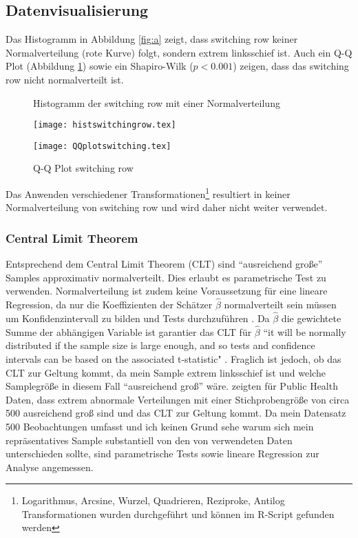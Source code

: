 \documentclass[11pt,a4paper]{article}
\begin{document}
\subsection{Datenvisualisierung}
Das Histogramm in Abbildung \ref{fig:a} zeigt, dass switching row keiner Normalverteilung (rote Kurve) folgt, sondern extrem linksschief ist. Auch ein Q-Q Plot (Abbildung \ref{fig:b}) sowie ein Shapiro-Wilk ($p < 0.001$) zeigen, dass das switching row nicht normalverteilt ist. 

\begin{figure}
    \centering
    \begin{minipage}{0.45\textwidth}
\caption{Histogramm der switching row mit einer Normalverteilung}\label{fig:a}
        \texttt{[image: histswitchingrow.tex]} %
        
    \end{minipage}\hfill
    \begin{minipage}{0.45\textwidth}
\caption{Q-Q Plot switching row}\label{fig:b}
        \texttt{[image: QQplotswitching.tex]} %
        
    \end{minipage}
\end{figure}

Das Anwenden verschiedener Transformationen\footnote{Logarithmus, Arcsine, Wurzel, Quadrieren, Reziproke, Antilog Transformationen wurden durchgeführt und können im R-Script gefunden werden} resultiert in keiner Normalverteilung von switching row und wird daher nicht weiter verwendet.\\

\subsubsection{Central Limit Theorem}
Entsprechend dem Central Limit Theorem (CLT) sind “ausreichend große'' Samples approximativ normalverteilt. Dies erlaubt es parametrische Test zu verwenden. Normalverteilung ist zudem keine Voraussetzung für eine lineare Regression, da nur die Koeffizienten der Schätzer $\hat{\beta}$ normalverteilt sein müssen um Konfidenzintervall zu bilden und Tests durchzuführen \parencite{lumley2002importance}. Da $\hat{\beta}$ die gewichtete Summe der abhängigen Variable ist garantier das CLT für $\hat{\beta}$ “it will be normally distributed if the sample size is large enough, and so tests and confidence intervals can be based on the associated t-statistic" \parencite{lumley2002importance}. Fraglich ist jedoch, ob das CLT zur Geltung kommt, da mein Sample extrem linksschief ist und welche Samplegröße in diesem Fall “ausreichend groß'' wäre. \textcite{lumley2002importance} zeigten für Public Health Daten, dass extrem abnormale Verteilungen mit einer Stichprobengröße von circa 500 ausreichend groß sind und das CLT zur Geltung kommt. Da mein Datensatz 500 Beobachtungen umfasst und ich keinen Grund sehe warum sich mein repräsentatives Sample substantiell von den von \textcite{lumley2002importance} verwendeten Daten unterschieden sollte, sind parametrische Tests sowie lineare Regression zur Analyse angemessen.
\end{document}
